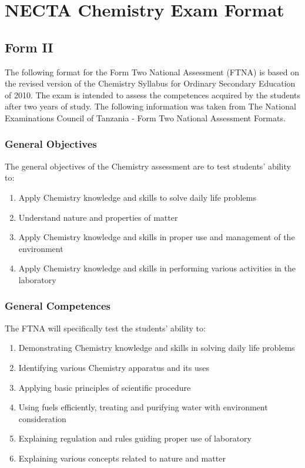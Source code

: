 \section{NECTA Chemistry Exam Format}
\label{sec:chemistry-format}

\subsection{Form II}
\noindent The following format for the Form Two National Assessment (FTNA) is based on the revised version of the Chemistry Syllabus for Ordinary Secondary Education of 2010. The exam is intended to assess the competences acquired by the students after two years of study. The following information was taken from The National Examinations Council of Tanzania - Form Two National Assessment Formats. %

\subsubsection{General Objectives}
\noindent The general objectives of the Chemistry assessment are to test students' ability to:
\begin{enumerate}
	\item Apply Chemistry knowledge and skills to solve daily life problems
	\item Understand nature and properties of matter
	\item Apply Chemistry knowledge and skills in proper use and management of the environment
	\item Apply Chemistry knowledge and skills in performing various activities in the laboratory
\end{enumerate}

\subsubsection{General Competences}
\noindent The FTNA will specifically test the students' ability to:
\begin{enumerate}
	\item Demonstrating Chemistry knowledge and skills in solving daily life problems
	\item Identifying various Chemistry apparatus and its uses
	\item Applying basic principles of scientific procedure
	\item Using fuels efficiently, treating and purifying water with environment consideration
	\item Explaining regulation and rules guiding proper use of laboratory
	\item Explaining various concepts related to nature and matter
\end{enumerate}

